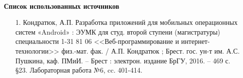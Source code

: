\documentclass[12pt, a4paper, simple]{eskdtext}
\begin{document}
    \paragraph{} \textbf{Список использованных источников} 
    \begin{enumerate}
        \item[1.] Кондратюк, А.П. Разработка приложений для мобильных операционных систем «Android» :
        ЭУМК для студ. второй ступени (магистратуры) специальности 1-31 81 06 <<Веб-программирование и интернет-технологии>>
        физ.-мат. фак. / А.П. Кондратюк ; Брест. гос. ун-т им. А.С. Пушкина, каф. ПМиИ. – Брест :
        электрон. издание БрГУ, 2016. – 469 с.\\
        §23. Лабораторная работа №6, cc. 401-414.
    \end{enumerate}
    \newpage
\end{document}
